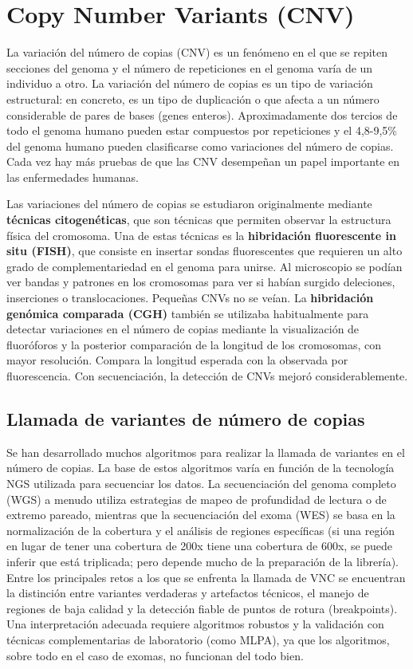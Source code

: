 \chapter{Copy Number Variants (CNV)}
La variación del número de copias (CNV) es un fenómeno en el que se repiten secciones del genoma
y el número de repeticiones en el genoma varía de un individuo a otro.
La variación del número de copias es un tipo de variación estructural: en concreto, es un tipo de duplicación o que afecta a un número considerable de pares de bases (genes enteros).
Aproximadamente dos tercios de todo el genoma humano pueden estar compuestos por repeticiones y el 4,8-9,5\% del genoma humano pueden clasificarse como variaciones del número de copias.
Cada vez hay más pruebas de que las CNV desempeñan un papel importante en las enfermedades humanas.

Las variaciones del número de copias se estudiaron originalmente mediante \textbf{técnicas citogenéticas}, que son técnicas que permiten observar la estructura física del cromosoma.
Una de estas técnicas es la \textbf{hibridación fluorescente in situ (FISH)}, que consiste en insertar sondas fluorescentes que requieren un alto grado de complementariedad en el genoma para unirse. Al microscopio se podían ver bandas y patrones en los cromosomas para ver si habían surgido deleciones, inserciones o translocaciones. Pequeñas CNVs no se veían.
La \textbf{hibridación genómica comparada (CGH)} también se utilizaba habitualmente para detectar variaciones en el número de copias mediante la visualización de fluoróforos y la posterior comparación de la longitud de los cromosomas, con mayor resolución. Compara la longitud esperada con la observada por fluorescencia. Con secuenciación, la detección de CNVs mejoró considerablemente. 

\section{Llamada de variantes de número de copias}
Se han desarrollado muchos algoritmos para realizar la llamada de variantes en el número de copias.
La base de estos algoritmos varía en función de la tecnología NGS utilizada para secuenciar los datos.
La secuenciación del genoma completo (WGS) a menudo utiliza estrategias de mapeo de profundidad de lectura o de extremo pareado, mientras que la secuenciación del exoma (WES) se basa en la normalización de la cobertura y el análisis de regiones específicas (si una región en lugar de tener una cobertura de 200x tiene una cobertura de 600x, se puede inferir que está triplicada; pero depende mucho de la preparación de la librería). 
Entre los principales retos a los que se enfrenta la llamada de VNC se encuentran la distinción entre variantes verdaderas y artefactos técnicos, el manejo de regiones de baja calidad y la detección fiable de puntos de rotura (breakpoints).
Una interpretación adecuada requiere algoritmos robustos y la validación con técnicas complementarias de laboratorio (como MLPA), ya que los algoritmos, sobre todo en el caso de exomas, no funcionan del todo bien.


